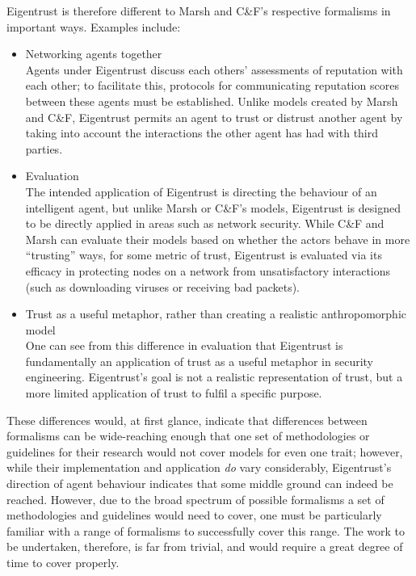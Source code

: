 Eigentrust is therefore different to Marsh and C\&F's respective formalisms in important ways. Examples include:
\begin{itemize}
    \item Networking agents together\\
        Agents under Eigentrust discuss each others' assessments of reputation with each other; to facilitate this, protocols for communicating reputation scores between these agents must be established. Unlike models created by Marsh and C\&F, Eigentrust permits an agent to trust or distrust another agent by taking into account the interactions the other agent has had with third parties.
    \item Evaluation\\
        The intended application of Eigentrust is directing the behaviour of an intelligent agent, but unlike Marsh or C\&F's models, Eigentrust is designed to be directly applied in areas such as network security. While C\&F and Marsh can evaluate their models based on whether the actors behave in more ``trusting'' ways, for some metric of trust, Eigentrust is evaluated via its efficacy in protecting nodes on a network from unsatisfactory interactions (such as downloading viruses or receiving bad packets).
    \item Trust as a useful metaphor, rather than creating a realistic anthropomorphic model\\
        One can see from this difference in evaluation that Eigentrust is fundamentally an application of trust as a useful metaphor in security engineering. Eigentrust's goal is not a realistic representation of trust, but a more limited application of trust to fulfil a specific purpose. 
\end{itemize}

These differences would, at first glance, indicate that differences between formalisms can be wide-reaching enough that one set of methodologies or guidelines for their research would not cover models for even one trait; however, while their implementation and application \emph{do} vary considerably, Eigentrust's direction of agent behaviour indicates that some middle ground can indeed be reached. However, due to the broad spectrum of possible formalisms a set of methodologies and guidelines would need to cover, one must be particularly familiar with a range of formalisms to successfully cover this range. The work to be undertaken, therefore, is far from trivial, and would require a great degree of time to cover properly.\par

